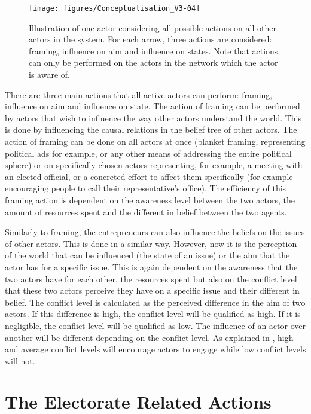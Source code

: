 \begin{figure}
\centering
\texttt{[image: figures/Conceptualisation\_V3-04]}
\caption{Illustration of one actor considering all possible actions on all other actors in the system. For each arrow, three actions are considered: framing, influence on aim and influence on states. Note that actions can only be performed on the actors in the network which the actor is aware of.}
\label{fig:Conceptualisation_V3-04}
\end{figure}

There are three main actions that all active actors can perform: framing, influence on aim and influence on state. The action of framing can be performed by actors that wish to influence the way other actors understand the world. This is done by influencing the causal relations in the belief tree of other actors. The action of framing can be done on all actors at once (blanket framing, representing political ads for example, or any other means of addressing the entire political sphere) or on specifically chosen actors representing, for example, a meeting with an elected official, or a concreted effort to affect them specifically (for example encouraging people to call their representative's office). The efficiency of this framing action is dependent on the awareness level between the two actors, the amount of resources spent and the different in belief between the two agents.

Similarly to framing, the entrepreneurs can also influence the beliefs on the issues of other actors. This is done in a similar way. However, now it is the perception of the world that can be influenced (the state of an issue) or the aim that the actor has for a specific issue. This is again dependent on the awareness that the two actors have for each other, the resources spent but also on the conflict level that these two actors perceive they have on a specific issue and their different in belief. The conflict level is calculated as the perceived difference in the aim of two actors. If this difference is high, the conflict level will be qualified as high. If it is negligible, the conflict level will be qualified as low. The influence of an actor over another will be different depending on the conflict level. As explained in \cite{jenkins2014advocacy}, high and average conflict levels will encourage actors to engage while low conflict levels will not.

%
\section{The Electorate Related Actions}
\label{sec:electorateRelatedActions}

